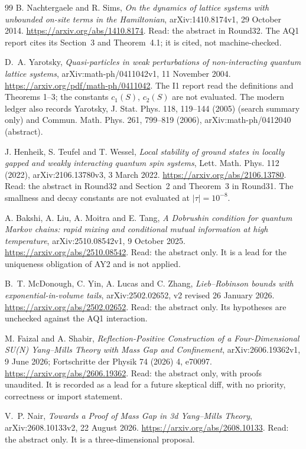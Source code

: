 \begin{thebibliography}{99}
B. Nachtergaele and R. Sims,
\emph{On the dynamics of lattice systems with unbounded on-site terms in the
Hamiltonian}, arXiv:1410.8174v1, 29 October 2014.
\url{https://arxiv.org/abs/1410.8174}.
Read: the abstract in Round32. The AQ1 report cites its Section~3 and
Theorem~4.1; it is cited, not machine-checked.

D.~A. Yarotsky,
\emph{Quasi-particles in weak perturbations of non-interacting quantum lattice
systems}, arXiv:math-ph/0411042v1, 11 November 2004.
\url{https://arxiv.org/pdf/math-ph/0411042}.
The I1 report read the definitions and Theorems 1--3; the constants
$c_1(S)$, $c_2(S)$ are not evaluated. The modern ledger also records
Yarotsky, J. Stat. Phys. 118, 119--144 (2005) (search summary only) and
Commun. Math. Phys. 261, 799--819 (2006), arXiv:math-ph/0412040 (abstract).

J. Henheik, S. Teufel and T. Wessel,
\emph{Local stability of ground states in locally gapped and weakly
interacting quantum spin systems}, Lett. Math. Phys. 112 (2022),
arXiv:2106.13780v3, 3 March 2022.
\url{https://arxiv.org/abs/2106.13780}.
Read: the abstract in Round32 and Section~2 and Theorem~3 in Round31. The
smallness and decay constants are not evaluated at $|\tau|=10^{-8}$.

A. Bakshi, A. Liu, A. Moitra and E. Tang,
\emph{A Dobrushin condition for quantum Markov chains: rapid mixing and
conditional mutual information at high temperature},
arXiv:2510.08542v1, 9 October 2025.
\url{https://arxiv.org/abs/2510.08542}.
Read: the abstract only. It is a lead for the uniqueness obligation of AY2
and is not applied.

B.~T. McDonough, C. Yin, A. Lucas and C. Zhang,
\emph{Lieb--Robinson bounds with exponential-in-volume tails},
arXiv:2502.02652, v2 revised 26 January 2026.
\url{https://arxiv.org/abs/2502.02652}.
Read: the abstract only. Its hypotheses are unchecked against the AQ1
interaction.

M. Faizal and A. Shabir,
\emph{Reflection-Positive Construction of a Four-Dimensional SU(N) Yang--Mills
Theory with Mass Gap and Confinement}, arXiv:2606.19362v1, 9 June 2026;
Fortschritte der Physik 74 (2026) 4, e70097.
\url{https://arxiv.org/abs/2606.19362}.
Read: the abstract only, with proofs unaudited. It is recorded as a lead for
a future skeptical diff, with no priority, correctness or import statement.

V.~P. Nair,
\emph{Towards a Proof of Mass Gap in 3d Yang--Mills Theory},
arXiv:2608.10133v2, 22 August 2026.
\url{https://arxiv.org/abs/2608.10133}.
Read: the abstract only. It is a three-dimensional proposal.


\end{thebibliography}
